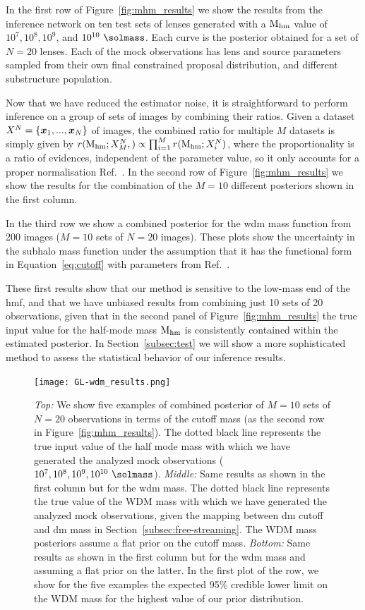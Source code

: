 In the first row of Figure~\ref{fig:mhm_results} we show the results from the inference network on ten test sets of lenses generated with a $\mathrm{M_{hm}}$ value of $10^7, 10^8, 10^9$, and $10^{10} \ \si{\solmass}$. Each curve is the posterior obtained for a set of $N=20$ lenses. Each of the mock observations has lens and source parameters sampled from their own final constrained proposal distribution, and different substructure population.  

Now that we have reduced the estimator noise, it is straightforward to perform inference on a group of sets of images by combining their ratios. Given a dataset $X^N=\{\bm{x}_1, ..., \bm{x}_N\}$ of images, the combined ratio for multiple $M$ datasets is simply given by $r(\mathrm{M_{hm}};X^N_M,) \propto \prod_{i=1}^M r(\mathrm{M_{hm}}; X^N_i)$, where the proportionality is a ratio of evidences, independent of the parameter value, so it only accounts for a proper normalisation Ref.~\cite{Brehmer:2019jyt, Hermans:2019ioj}.
In the second row of Figure~\ref{fig:mhm_results} we show the results for the combination of the $M=10$ different posteriors shown in the first column.

In the third row we show a combined posterior for the \gls*{wdm} mass function from 200 images ($M=10$ sets of $N=20$ images). These plots show the uncertainty in the subhalo mass function under the assumption that it has the functional form in Equation~\eqref{eq:cutoff} with parameters from Ref.~\cite{Lovell:2020bcy}.

These first results show that our method is sensitive to the low-mass end of the \gls*{hmf}, and that we have unbiased results from combining just 10 sets of 20 observations, given that in the second panel of Figure~\ref{fig:mhm_results} the true input value for the half-mode mass $\mathrm{M_{hm}}$ is consistently contained within the estimated posterior. In Section~\ref{subsec:test} we will show a more sophisticated method to assess the statistical behavior of
our inference results.

\begin{figure}
	\centering
	\texttt{[image: GL-wdm\_results.png]}
	\caption{\textit{Top:} We show five examples of combined posterior of $M=10$ sets of $N=20$ observations in terms of the cutoff mass (as the second row in Figure~\ref{fig:mhm_results}). The dotted black line represents the true input value of the half mode mass with which we have generated the analyzed mock observations ($10^7, 10^8, 10^9,  10^{10} \ \si{\solmass}$). \textit{Middle:} Same results as shown in the first column but for the \gls*{wdm} mass. The dotted black line represents the true value of the WDM mass with which we have generated the analyzed mock observations, given the mapping between \gls*{dm} cutoff and \gls*{dm} mass in Section~\ref{subsec:free-streaming}. The WDM mass posteriors assume a flat prior on the cutoff mass. \textit{Bottom:} Same results as shown in the first column but for the \gls*{wdm} mass and assuming a flat prior on the latter. In the first plot of the row, we show for the five examples the expected 95\% credible lower limit on the WDM mass for the highest value of our prior distribution.}
\label{fig:wdm_results}
\end{figure}

